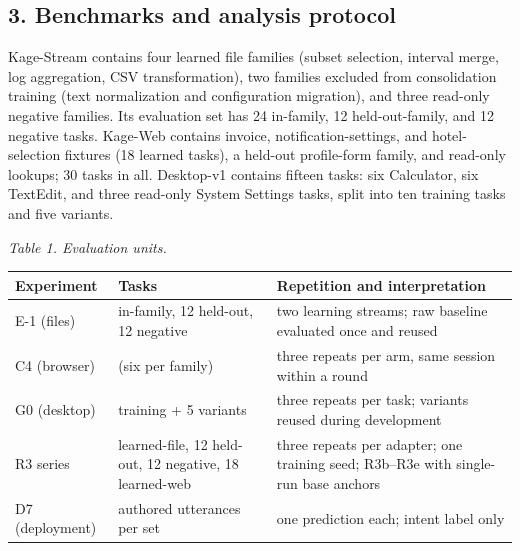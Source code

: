 \documentclass[
  10pt,
]{article}
\newcounter{none} %
\begin{document}
\subsection{3. Benchmarks and analysis
protocol}\label{benchmarks-and-analysis-protocol}

Kage-Stream contains four learned file families (subset selection,
interval merge, log aggregation, CSV transformation), two families
excluded from consolidation training (text normalization and
configuration migration), and three read-only negative families. Its
evaluation set has 24 in-family, 12 held-out-family, and 12 negative
tasks. Kage-Web contains invoice, notification-settings, and
hotel-selection fixtures (18 learned tasks), a held-out profile-form
family, and read-only lookups; 30 tasks in all. Desktop-v1 contains
fifteen tasks: six Calculator, six TextEdit, and three read-only System
Settings tasks, split into ten training tasks and five variants.

\emph{Table 1. Evaluation units.}

{\def\LTcaptype{none} %
\begin{longtable}[]{@{}
  >{\raggedright\arraybackslash}p{}
  >{\raggedright\arraybackslash}p{}
  >{\raggedright\arraybackslash}p{}@{}}
\toprule\noalign{}
\begin{minipage}[b]{\linewidth}\raggedright
Experiment
\end{minipage} & \begin{minipage}[b]{\linewidth}\raggedright
Tasks
\end{minipage} & \begin{minipage}[b]{\linewidth}\raggedright
Repetition and interpretation
\end{minipage} \\
\midrule\noalign{}
\endhead
\bottomrule\noalign{}
\endlastfoot
E-1 (files) & 24 in-family, 12 held-out, 12 negative & two learning
streams; raw baseline evaluated once and reused \\
C4 (browser) & 30 (six per family) & three repeats per arm, same session
within a round \\
G0 (desktop) & 10 training + 5 variants & three repeats per task;
variants reused during development \\
R3 series & 24 learned-file, 12 held-out, 12 negative, 18 learned-web &
three repeats per adapter; one training seed; R3b--R3e with single-run
base anchors \\
D7 (deployment) & 30 authored utterances per set & one prediction each;
intent label only \\
\end{longtable}
}
\end{document}
